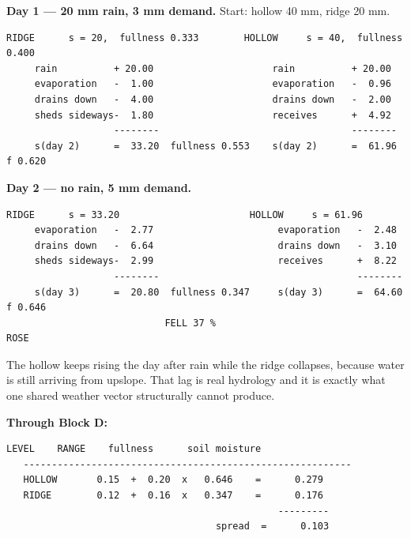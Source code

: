 \documentclass[10pt,a4paper]{article}
\begin{document}
\textbf{Day 1 — 20 mm rain, 3 mm demand.} Start: hollow 40 mm, ridge 20 mm.

\begin{Verbatim}[fontsize=\scriptsize,frame=leftline,framerule=0.6pt,rulecolor=\color{rulegray},xleftmargin=6pt,framesep=6pt,]
   RIDGE      s = 20,  fullness 0.333        HOLLOW     s = 40,  fullness 0.400
     rain          + 20.00                     rain          + 20.00
     evaporation   -  1.00                     evaporation   -  0.96
     drains down   -  4.00                     drains down   -  2.00
     sheds sideways-  1.80                     receives      +  4.92
                   --------                                  --------
     s(day 2)      =  33.20  fullness 0.553    s(day 2)      =  61.96  f 0.620
\end{Verbatim}

\textbf{Day 2 — no rain, 5 mm demand.}

\begin{Verbatim}[fontsize=\scriptsize,frame=leftline,framerule=0.6pt,rulecolor=\color{rulegray},xleftmargin=6pt,framesep=6pt,]
   RIDGE      s = 33.20                       HOLLOW     s = 61.96
     evaporation   -  2.77                      evaporation   -  2.48
     drains down   -  6.64                      drains down   -  3.10
     sheds sideways-  2.99                      receives      +  8.22
                   --------                                   --------
     s(day 3)      =  20.80  fullness 0.347     s(day 3)      =  64.60  f 0.646
                            FELL 37 %                                 ROSE
\end{Verbatim}

The hollow keeps rising the day after rain while the ridge collapses, because
water is still arriving from upslope. That lag is real hydrology and it is
exactly what one shared weather vector structurally cannot produce.

\textbf{Through Block D:}

\begin{Verbatim}[fontsize=\scriptsize,frame=leftline,framerule=0.6pt,rulecolor=\color{rulegray},xleftmargin=6pt,framesep=6pt,]
                LEVEL    RANGE    fullness      soil moisture
   ----------------------------------------------------------
   HOLLOW       0.15  +  0.20  x   0.646    =      0.279
   RIDGE        0.12  +  0.16  x   0.347    =      0.176
                                                ---------
                                     spread  =      0.103
\end{Verbatim}
\end{document}
